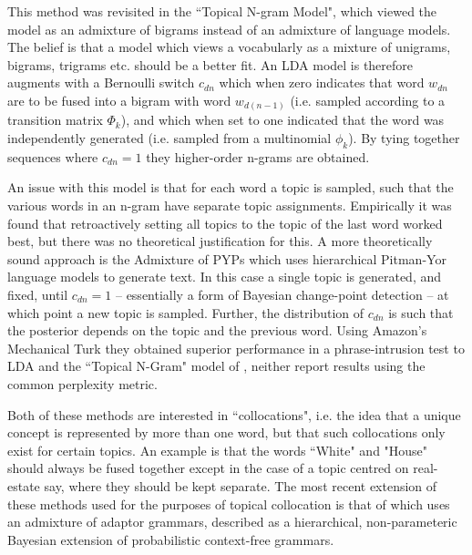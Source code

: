 This method was revisited in the ``Topical N-gram Model"\cite{Wang2007}, which viewed the model as an admixture of bigrams instead of an admixture of language models. The belief is that a model which views a vocabularly as a mixture of unigrams, bigrams, trigrams etc. should be a better fit. An LDA model is therefore augments with a Bernoulli switch $c_{dn}$ which when zero indicates that word $w_{dn}$ are to be fused into a bigram with word $w_{d(n-1)}$ (i.e. sampled according to a transition matrix $\Phi_k$), and which when set to one indicated that the word was independently generated (i.e. sampled from a multinomial $\phi_k$). By tying together sequences where $c_{dn}=1$ they higher-order n-grams are obtained.

An issue with this model is that for each word a topic is sampled, such that the various words in an n-gram have separate topic assignments. Empirically it was found that retroactively setting all topics to the topic of the last word worked best, but there was no theoretical justification for this. A more theoretically sound approach is the Admixture of PYPs \cite{Lindsey2012} which uses hierarchical Pitman-Yor language models to generate text. In this case a single topic is generated, and fixed, until $c_{dn}=1$ -- essentially a form of Bayesian change-point detection -- at which point a new topic is sampled. Further, the distribution of $c_{dn}$ is such that the posterior depends on the topic and the previous word. Using Amazon's Mechanical Turk they obtained superior performance in a phrase-intrusion test to LDA and the ``Topical N-Gram" model of \cite{Wang2007}, neither report results using the common perplexity metric.

Both of these methods are interested in ``collocations", i.e. the idea that a unique concept is represented by more than one word, but that such collocations only exist for certain topics. An example is that the words ``White" and "House" should always be fused together except in the case of a topic centred on real-estate say, where they should be kept separate. The most recent extension of these methods used for the purposes of topical collocation is that of \cite{Johnson2010} which uses an admixture of adaptor grammars, described as a hierarchical, non-parameteric Bayesian extension of probabilistic context-free grammars.

